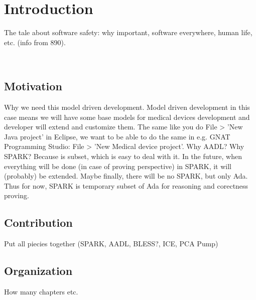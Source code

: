 
\cleardoublepage


\chapter{Introduction}
\label{introduction}

The tale about software safety: why important, software everywhere, human life, etc. (info from 890).

\

\section{Motivation}
\label{introduction:motivation}
Why we need this model driven development.
Model driven development in this case means we will have some base models for medical devices development and developer will extend and customize them. The same like you do File > 'New Java project' in Eclipse, we want to be able to do the same in e.g. GNAT Programming Studio: File > 'New Medical device project'.
Why AADL?
Why SPARK? Because is subset, which is easy to deal with it. In the future, when everything will be done (in case of proving perspective) in SPARK, it will (probably) be extended. Maybe finally, there will be no SPARK, but only Ada. Thus for now, SPARK is temporary subset of Ada for reasoning and corectness proving.

\section{Contribution}
\label{introduction:contribution}
Put all piecies together (SPARK, AADL, BLESS?, ICE, PCA Pump)

\section{Organization}
\label{introduction:organization}
How many chapters etc.
